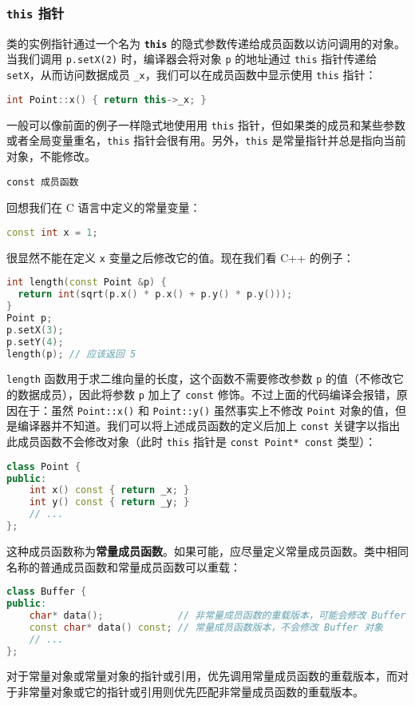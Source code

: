 \documentclass[hyperref,UTF8]{article}
\begin{document}
\subsubsection{\texttt{this} 指针}

类的实例指针通过一个名为 \textbf{\texttt{this}} 的隐式参数传递给成员函数以访问调用的对象。当我们调用 \texttt{p.setX(2)} 时，编译器会将对象 \texttt{p} 的地址通过 \texttt{this} 指针传递给 \texttt{setX}，从而访问数据成员 \texttt{\_x}，我们可以在成员函数中显示使用 \texttt{this} 指针：
\begin{lstlisting}[language=c++]
int Point::x() { return this->_x; }
\end{lstlisting}
一般可以像前面的例子一样隐式地使用用 \texttt{this} 指针，但如果类的成员和某些参数或者全局变量重名，\texttt{this} 指针会很有用。另外，\texttt{this} 是常量指针并总是指向当前对象，不能修改。

\texttt{const 成员函数}

回想我们在 C 语言中定义的常量变量：
\begin{lstlisting}[language=c++,numbers=none]
const int x = 1;
\end{lstlisting}
很显然不能在定义 \texttt{x} 变量之后修改它的值。现在我们看 C++ 的例子：
\begin{lstlisting}[language=c++]
int length(const Point &p) {
  return int(sqrt(p.x() * p.x() + p.y() * p.y()));
}
Point p;
p.setX(3);
p.setY(4);
length(p); // 应该返回 5
\end{lstlisting}
\texttt{length} 函数用于求二维向量的长度，这个函数不需要修改参数 \texttt{p} 的值（不修改它的数据成员），因此将参数 \texttt{p} 加上了 \texttt{const} 修饰。不过上面的代码编译会报错，原因在于：虽然 \texttt{Point::x()} 和 \texttt{Point::y()} 虽然事实上不修改 \texttt{Point} 对象的值，但是编译器并不知道。我们可以将上述成员函数的定义后加上 \texttt{const} 关键字以指出此成员函数不会修改对象（此时 \texttt{this} 指针是 \texttt{const Point* const} 类型）：
\begin{lstlisting}[language=c++]
class Point {
public:
    int x() const { return _x; }
    int y() const { return _y; }
    // ...
};
\end{lstlisting}
这种成员函数称为\textbf{常量成员函数}。如果可能，应尽量定义常量成员函数。类中相同名称的普通成员函数和常量成员函数可以重载：
\begin{lstlisting}[language=c++]
class Buffer {
public:
    char* data();             // 非常量成员函数的重载版本，可能会修改 Buffer 对象
    const char* data() const; // 常量成员函数版本，不会修改 Buffer 对象
    // ...
};
\end{lstlisting}
对于常量对象或常量对象的指针或引用，优先调用常量成员函数的重载版本，而对于非常量对象或它的指针或引用则优先匹配非常量成员函数的重载版本。
\end{document}
